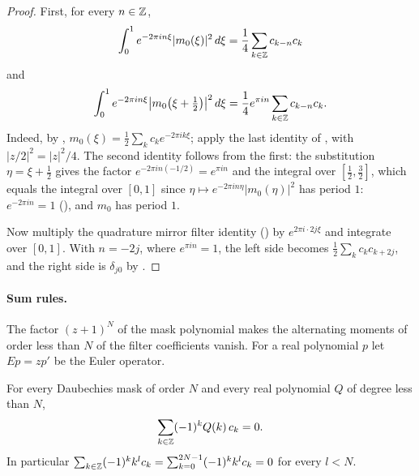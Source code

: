 \begin{proof}
\leanok
{}
First, for every $n \in \mathbb{Z}$,
\[
  \int_0^1 e^{-2\pi i n \xi} |m_0(\xi)|^2 \, d\xi = \frac14 \sum_{k \in \mathbb{Z}} c_{k-n} c_k
\]
and
\[
  \int_0^1 e^{-2\pi i n \xi} \bigl|m_0\bigl(\xi + \tfrac12\bigr)\bigr|^2 \, d\xi
  = \frac14 e^{\pi i n} \sum_{k \in \mathbb{Z}} c_{k-n} c_k .
\]
Indeed, by , $m_0(\xi) = \frac12 \sum_k c_k e^{-2\pi i k \xi}$;
apply the last identity of , with $|z/2|^2 = |z|^2/4$. The
second identity follows from the first: the substitution $\eta = \xi + \frac12$ gives the factor
$e^{-2\pi i n (-1/2)} = e^{\pi i n}$ and the integral over $[\frac12, \frac32]$, which equals the
integral over $[0, 1]$ since $\eta \mapsto e^{-2\pi i n \eta} |m_0(\eta)|^2$ has period $1$:
$e^{-2\pi i n} = 1$ (), and $m_0$ has period $1$.

Now multiply the quadrature mirror filter identity () by
$e^{2\pi i \cdot 2j \xi}$ and integrate over $[0, 1]$. With $n = -2j$, where $e^{\pi i n} = 1$,
the left side becomes $\frac12 \sum_k c_k c_{k+2j}$, and the right side is $\delta_{j0}$ by
.
\end{proof}

\paragraph{Sum rules.}
The factor $(z + 1)^N$ of the mask polynomial makes the alternating moments of order less than
$N$ of the filter coefficients vanish. For a real polynomial $p$ let $E p = z p'$ be the Euler
operator.

\begin{theorem}
\label{thm:daub-sum-rules}
\leanok
{}
For every Daubechies mask of order $N$ and every real polynomial $Q$ of degree less than $N$,
\[
  \sum_{k \in \mathbb{Z}} (-1)^k Q(k) \, c_k = 0 .
\]
In particular $\sum_{k \in \mathbb{Z}} (-1)^k k^l c_k = \sum_{k=0}^{2N-1} (-1)^k k^l c_k = 0$ for every
$l < N$.
\end{theorem}

